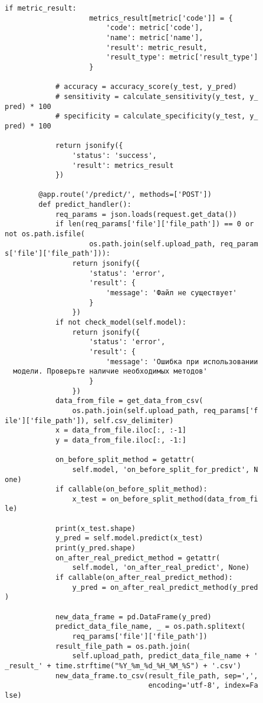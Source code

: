 \begin{lstlisting}[caption={Код backend-части приложения}, label={ls:a:01}]
                if metric_result:
                    metrics_result[metric['code']] = {
                        'code': metric['code'],
                        'name': metric['name'],
                        'result': metric_result,
                        'result_type': metric['result_type']
                    }

            # accuracy = accuracy_score(y_test, y_pred)
            # sensitivity = calculate_sensitivity(y_test, y_
pred) * 100
            # specificity = calculate_specificity(y_test, y_
pred) * 100

            return jsonify({
                'status': 'success',
                'result': metrics_result
            })

        @app.route('/predict/', methods=['POST'])
        def predict_handler():
            req_params = json.loads(request.get_data())
            if len(req_params['file']['file_path']) == 0 or
not os.path.isfile(
                    os.path.join(self.upload_path, req_param
s['file']['file_path'])):
                return jsonify({
                    'status': 'error',
                    'result': {
                        'message': 'Файл не существует'
                    }
                })
            if not check_model(self.model):
                return jsonify({
                    'status': 'error',
                    'result': {
                        'message': 'Ошибка при использовании
  модели. Проверьте наличие необходимых методов'
                    }
                })
            data_from_file = get_data_from_csv(
                os.path.join(self.upload_path, req_params['f
ile']['file_path']), self.csv_delimiter)
            x = data_from_file.iloc[:, :-1]
            y = data_from_file.iloc[:, -1:]

            on_before_split_method = getattr(
                self.model, 'on_before_split_for_predict', N
one)
            if callable(on_before_split_method):
                x_test = on_before_split_method(data_from_fi
le)

            print(x_test.shape)
            y_pred = self.model.predict(x_test)
            print(y_pred.shape)
            on_after_real_predict_method = getattr(
                self.model, 'on_after_real_predict', None)
            if callable(on_after_real_predict_method):
                y_pred = on_after_real_predict_method(y_pred
)

            new_data_frame = pd.DataFrame(y_pred)
            predict_data_file_name, _ = os.path.splitext(
                req_params['file']['file_path'])
            result_file_path = os.path.join(
                self.upload_path, predict_data_file_name + '
_result_' + time.strftime("%Y_%m_%d_%H_%M_%S") + '.csv')
            new_data_frame.to_csv(result_file_path, sep=',',
                                  encoding='utf-8', index=Fa
lse)


\end{lstlisting}
